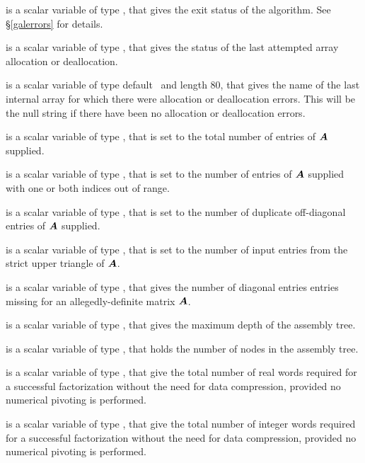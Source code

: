 \documentclass{galahad}
\begin{document}
\begin{description}

 is a scalar variable of type \integer, that gives the
exit status of the algorithm.
See \S\ref{galerrors}
for details.

 is a scalar variable of type \integer, that gives
the status of the last attempted array allocation or deallocation.

 is a scalar variable of type default \character\
and length 80, that  gives the name of the last internal array
for which there were allocation or deallocation errors.
This will be the null string if there have been no
allocation or deallocation errors.


 is a scalar variable of type \integer,
that is set to the total number of entries of ${\bm{A}}$ supplied.

 is a scalar variable of type \integer,
that is set to the number of
entries of ${\bm{A}}$ supplied with one or both indices out of range.

 is a scalar variable of type \integer,
that is set to the number of duplicate off-diagonal entries of ${\bm{A}}$ supplied.

 is a scalar variable of type \integer,
that is set to the number of input entries from the strict upper triangle
of ${\bm{A}}$.

 is a scalar variable of type \integer,
that gives the number of diagonal entries entries missing for an
allegedly-definite matrix ${\bm{A}}$.

 is a scalar variable of type \integer,
that gives the maximum depth of the assembly tree.

 is a scalar variable of type \integer,
that holds the number of nodes in the assembly tree.

 is a scalar variable of type \longinteger,
that give the total number of real words required for a
successful factorization without the need for data compression,
provided no numerical pivoting is performed.

 is a scalar variable of type \longinteger,
that give the total number of integer words required for a
successful factorization without the need for data compression,
provided no numerical pivoting is performed.


\end{description}
\end{document}
